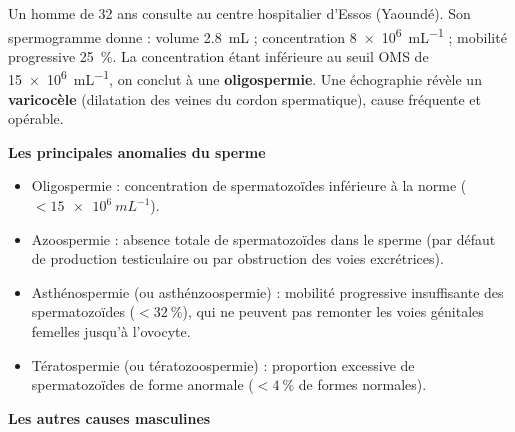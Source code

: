 \documentclass[11pt]{article}
\newcommand{\cle}[1]{{\popxbold\color{popdark}#1}}
\begin{document}
\begin{exemplebox}
Un homme de 32 ans consulte au centre hospitalier d'Essos (Yaoundé). Son spermogramme donne : volume \SI{2,8}{mL} ; concentration \SI{8e6}{mL^{-1}} ; mobilité progressive \SI{25}{\percent}. La concentration étant inférieure au seuil OMS de \SI{15e6}{mL^{-1}}, on conclut à une \textbf{oligospermie}. Une échographie révèle un \textbf{varicocèle} (dilatation des veines du cordon spermatique), cause fréquente et opérable.
\end{exemplebox}

\textbf{Les principales anomalies du sperme}\par

\begin{definition}
\begin{itemize}
  \item \cle{Oligospermie} : concentration de spermatozoïdes inférieure à la norme ($< \SI{15e6}{mL^{-1}}$).
  \item \cle{Azoospermie} : absence totale de spermatozoïdes dans le sperme (par défaut de production testiculaire ou par obstruction des voies excrétrices).
  \item \cle{Asthénospermie} (ou asthénzoospermie) : mobilité progressive insuffisante des spermatozoïdes ($< \SI{32}{\percent}$), qui ne peuvent pas remonter les voies génitales femelles jusqu'à l'ovocyte.
  \item \cle{Tératospermie} (ou tératozoospermie) : proportion excessive de spermatozoïdes de forme anormale ($< \SI{4}{\percent}$ de formes normales).
\end{itemize}
\end{definition}

\textbf{Les autres causes masculines}\par
\end{document}
